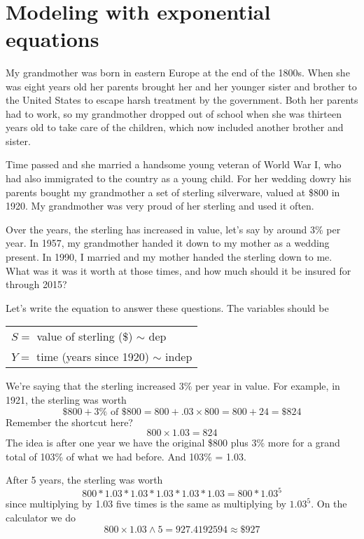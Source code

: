 ~\vspace{.1in}

\section{Modeling with exponential equations}

My grandmother was born in eastern Europe at the end of the 1800s.  When she was eight years old her parents brought her and her younger sister and brother to the United States to escape harsh treatment by the government.  Both her parents had to work, so my grandmother dropped out of school when she was thirteen years old to take care of the children, which now included another brother and sister. 

Time passed and she married a handsome young veteran of World War I, who had also immigrated to the country as a young child.  
For her wedding dowry his parents bought my grandmother a set of sterling silverware, valued at \$800 in 1920.  My grandmother was very proud of her sterling and used it often.

Over the years, the sterling has increased in value, let's say by around 3\% per year.  In 1957, my grandmother handed it down to my mother as a wedding present.  In 1990, I married and my mother handed the sterling down to me.   What was it was it worth at those times, and how much should it be insured for through 2015?  

Let's write the equation to answer these questions.  The variables should be
\begin{center}
\begin{tabular} {l} 
$S=$ value of sterling (\$) $\sim$ dep \\ 
$Y =$ time (years since 1920) $\sim$ indep \\
\end{tabular}
\end{center}

We're saying that the sterling increased 3\% per year in value.  For example, in 1921, the sterling was worth
$$\$800 + 3\% \text{ of } \$800 = 800 + .03 \times 800 = 800 + 24= \$824$$
Remember the shortcut here? 
$$800 \times 1.03 = 824$$
The idea is after one year we have the original \$800 plus 3\% more for a grand total of 103\% of what we had before.  And 103\% = 1.03.  

After 5 years, the sterling was worth
$$800 \ast 1.03 \ast 1.03  \ast 1.03  \ast 1.03  \ast 1.03 = 800 \ast 1.03^5$$ 
since multiplying by 1.03 five times is the same as multiplying by $1.03^5$.
On the calculator we do
$$800 \times 1.03 \wedge 5 = 927.4192594 \approx \$927$$


